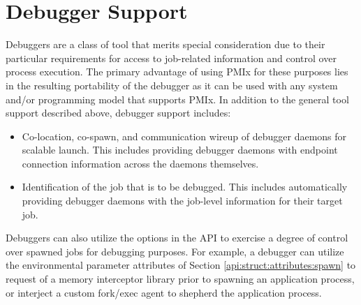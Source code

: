 %
%


\section{Debugger Support}
\label{chap:api_tools:debuggers}

Debuggers are a class of tool that merits special consideration due to their particular requirements for access to job-related information and control over process execution. The primary advantage of using \ac{PMIx} for these purposes lies in the resulting portability of the debugger as it can be used with any system and/or programming model that supports \ac{PMIx}. In addition to the general tool support described above, debugger support includes:

\begin{itemize}
    \item Co-location, co-spawn, and communication wireup of debugger daemons for scalable launch. This includes providing debugger daemons with endpoint connection information across the daemons themselves.
    \item Identification of the job that is to be debugged. This includes automatically providing debugger daemons with the job-level information for their target job.
\end{itemize}

Debuggers can also utilize the options in the  \ac{API} to exercise a degree of control over spawned jobs for debugging purposes. For example, a debugger can utilize the environmental parameter attributes of Section \ref{api:struct:attributes:spawn} to request  of a memory interceptor library prior to spawning an application process, or interject a custom fork/exec agent to shepherd the application process.

